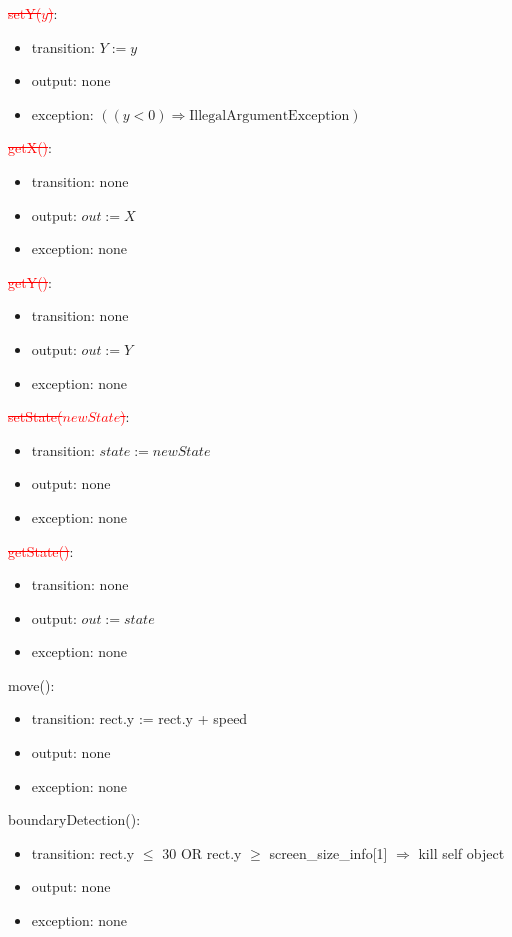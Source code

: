 \documentclass[12pt]{article}
\begin{document}
\noindent \textcolor{red}{\st{
setY($\mathit{y}$)}}:
\begin{itemize}
\item transition: $Y := y$ 
\item output: none
\item exception: $((\mathit{y} < 0) \Rightarrow \text{IllegalArgumentException})$
\end{itemize}

\noindent  \textcolor{red}{\st{
getX()}}:
\begin{itemize}
\item transition: none
\item output: $out := X$
\item exception: none
\end{itemize}

\noindent \textcolor{red}{\st{
getY()}}:
\begin{itemize}
\item transition: none
\item output: $out := Y$
\item exception: none
\end{itemize}

\noindent \textcolor{red}{\st{
setState($\mathit{newState}$)}}:
\begin{itemize}
\item transition: $state := newState$ 
\item output: none
\item exception: none
\end{itemize}

\noindent \textcolor{red}{\st{
getState()}}:
\begin{itemize}
\item transition: none
\item output: $out := state$
\item exception: none
\end{itemize}

\noindent move():
\begin{itemize}
\item transition: rect.y := rect.y + speed
\item output: none
\item exception: none
\end{itemize}


\noindent boundaryDetection():
\begin{itemize}
\item transition: rect.y $\leq$ 30 OR rect.y $\geq$ screen\_size\_info[1] $\Rightarrow$
kill self object
\item output: none
\item exception: none
\end{itemize}
\end{document}
